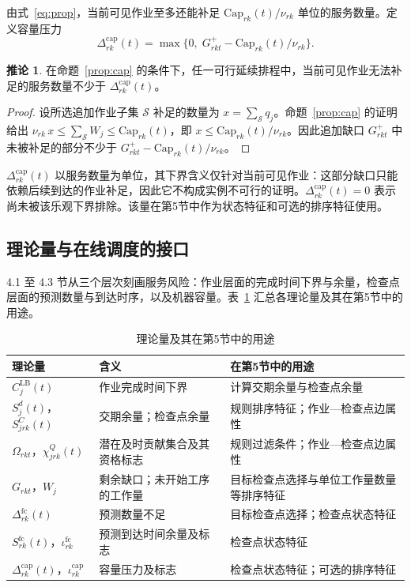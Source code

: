 \documentclass[12pt,a4paper]{article}
\theoremstyle{definition}
\newtheorem{corollary}{推论}
\newcommand{\CapR}{\mathrm{Cap}}
\begin{document}
由式~\eqref{eq:prop}，当前可见作业至多还能补足 $\CapR_{rk}(t)/\nu_{rk}$ 单位的服务数量。定义容量压力
\begin{equation}\label{eq:dcap}
  \Delta^{\mathrm{cap}}_{rk}(t)=\max\bigl\{0,\;G^{+}_{rkt}-\CapR_{rk}(t)/\nu_{rk}\bigr\}.
\end{equation}

\begin{corollary}\label{cor:cap}
在命题~\ref{prop:cap} 的条件下，任一可行延续排程中，当前可见作业无法补足的服务数量不少于 $\Delta^{\mathrm{cap}}_{rk}(t)$。
\end{corollary}
\begin{proof}
设所选追加作业子集 $\mathcal{S}$ 补足的数量为 $x=\sum_{\mathcal{S}}q_j$。命题~\ref{prop:cap} 的证明给出 $\nu_{rk}\,x\le\sum_{\mathcal{S}}W_j\le\CapR_{rk}(t)$，即 $x\le\CapR_{rk}(t)/\nu_{rk}$。因此追加缺口 $G^{+}_{rkt}$ 中未被补足的部分不少于 $G^{+}_{rkt}-\CapR_{rk}(t)/\nu_{rk}$。
\end{proof}

$\Delta^{\mathrm{cap}}_{rk}(t)$ 以服务数量为单位，其下界含义仅针对当前可见作业：这部分缺口只能依赖后续到达的作业补足，因此它不构成实例不可行的证明。$\Delta^{\mathrm{cap}}_{rk}(t)=0$ 表示尚未被该乐观下界排除。该量在第5节中作为状态特征和可选的排序特征使用。

\subsection{理论量与在线调度的接口}

4.1 至 4.3 节从三个层次刻画服务风险：作业层面的完成时间下界与余量，检查点层面的预测数量与到达时序，以及机器容量。表~\ref{tab:iface} 汇总各理论量及其在第5节中的用途。

\begin{table}[t]
  \centering
  \caption{理论量及其在第5节中的用途}\label{tab:iface}
  \small
  \begin{tabular}{@{}>{\raggedright}p{3.6cm}>{\raggedright}p{3.2cm}>{\raggedright\arraybackslash}p{7.2cm}@{}}
    \toprule
    理论量 & 含义 & 在第5节中的用途 \\
    \midrule
    $C^{\mathrm{LB}}_j(t)$ & 作业完成时间下界 & 计算交期余量与检查点余量 \\
    $S^{d}_j(t)$，$S^{C}_{jrk}(t)$ & 交期余量；检查点余量 & 规则排序特征；作业—检查点边属性 \\
    $\Omega_{rkt}$，$\chi^{Q}_{jrk}(t)$ & 潜在及时贡献集合及其资格标志 & 规则过滤条件；作业—检查点边属性 \\
    $G_{rkt}$，$W_j$ & 剩余缺口；未开始工序的工作量 & 目标检查点选择与单位工作量数量等排序特征 \\
    $\Delta^{\mathrm{fc}}_{rk}(t)$ & 预测数量不足 & 目标检查点选择；检查点状态特征 \\
    $S^{\mathrm{fc}}_{rk}(t)$，$\iota^{\mathrm{fc}}_{rk}$ & 预测到达时间余量及标志 & 检查点状态特征 \\
    $\Delta^{\mathrm{cap}}_{rk}(t)$，$\iota^{\mathrm{cap}}_{rk}$ & 容量压力及标志 & 检查点状态特征；可选的排序特征 \\
    \bottomrule
  \end{tabular}
\end{table}
\end{document}
